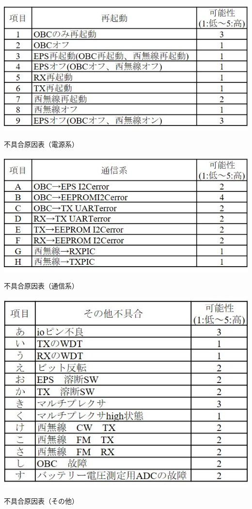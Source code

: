 \begin{itemize}
	\newpage
	\begin{table}[H]
		\centering
		\includegraphics[scale=1]{03/fig/t3-4-Ini-0-a.jpg}
		\caption{不具合原因表（電源系）}
		\label{table3-4-Ini-0-a}
	\end{table}
	\begin{table}[H]
	\centering
	\includegraphics[scale=1]{03/fig/t3-4-Ini-0-b.jpg}
	\caption{不具合原因表（通信系）}
	\label{table3-4-Ini-0-b}
	\end{table}
	\begin{table}[H]
	\centering
	\includegraphics[scale=1]{03/fig/t3-4-Ini-0-c.jpg}
	\caption{不具合原因表（その他）}
	\label{table3-4-Ini-0-c}
	\end{table}
	\newpage
	

\end{itemize}

